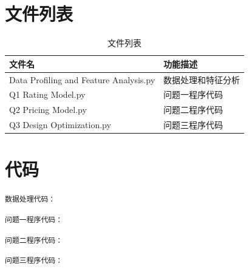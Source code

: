 \documentclass[withoutpreface,bwprint]{cumcmthesis} %
\begin{document}
\newpage
\begin{appendices}
\section{文件列表}
\begin{table}[H]
\centering
\begin{tabularx}{\textwidth}{LL}
\toprule
文件名   & 功能描述 \\
\midrule
Data Profiling and Feature Analysis.py & 数据处理和特征分析 \\
Q1 Rating Model.py & 问题一程序代码 \\
Q2 Pricing Model.py & 问题二程序代码 \\
Q3 Design Optimization.py & 问题三程序代码 \\

\bottomrule
\end{tabularx}
\caption{文件列表}
\label{tab:文件列表}
\end{table}

\section{代码}

\noindent\texttt{数据处理代码：}



\noindent\texttt{问题一程序代码：}



\noindent\texttt{问题二程序代码：}



\noindent\texttt{问题三程序代码：}




\end{appendices}
\end{document}

